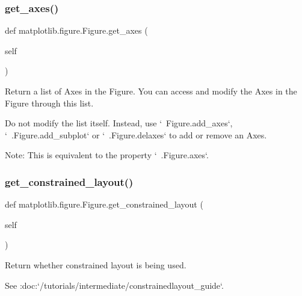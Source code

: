 \subsubsection{\texorpdfstring{get\+\_\+axes()}{get\_axes()}}
{\footnotesize\ttfamily def matplotlib.\+figure.\+Figure.\+get\+\_\+axes (\begin{DoxyParamCaption}\item[{}]{self }\end{DoxyParamCaption})}

\begin{DoxyVerb}Return a list of Axes in the Figure. You can access and modify the
Axes in the Figure through this list.

Do not modify the list itself. Instead, use `~Figure.add_axes`,
`~.Figure.add_subplot` or `~.Figure.delaxes` to add or remove an Axes.

Note: This is equivalent to the property `~.Figure.axes`.
\end{DoxyVerb}
 \mbox{\label{classmatplotlib_1_1figure_1_1Figure_a592516bbe8c42d6050053ccd21e4c7d9}} 
\subsubsection{\texorpdfstring{get\+\_\+constrained\+\_\+layout()}{get\_constrained\_layout()}}
{\footnotesize\ttfamily def matplotlib.\+figure.\+Figure.\+get\+\_\+constrained\+\_\+layout (\begin{DoxyParamCaption}\item[{}]{self }\end{DoxyParamCaption})}

\begin{DoxyVerb}Return whether constrained layout is being used.

See :doc:`/tutorials/intermediate/constrainedlayout_guide`.
\end{DoxyVerb}
 \mbox{\label{classmatplotlib_1_1figure_1_1Figure_afac5d61e08d7361ff9d25e79e6b0e7a7}} 
